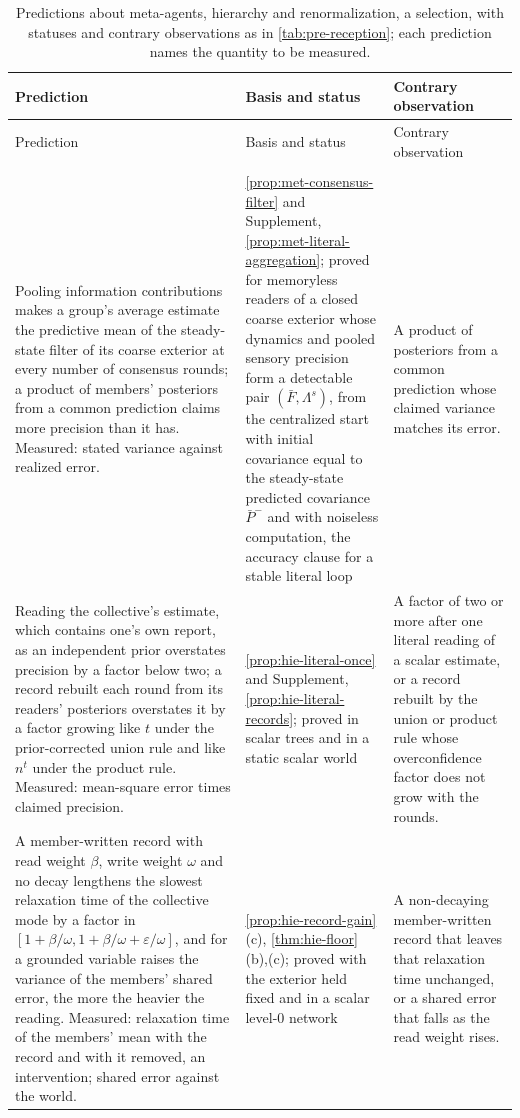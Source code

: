 \begingroup
\footnotesize
\setlength{\tabcolsep}{4pt}
\begin{longtable}{@{}>{\raggedright\arraybackslash}p{6.5cm}>{\raggedright\arraybackslash}p{3.9cm}>{\raggedright\arraybackslash}p{5.1cm}@{}}
\caption{Predictions about meta-agents, hierarchy and renormalization, a selection, with statuses and contrary observations as in \cref{tab:pre-reception}; each prediction names the quantity to be measured.}\label{tab:pre-meta}\\
\toprule
Prediction & Basis and status & Contrary observation\\
\midrule
\endfirsthead
\toprule
Prediction & Basis and status & Contrary observation\\
\midrule
\endhead
\bottomrule
\endfoot
\multicolumn{3}{@{}l}{\textit{Meta-agents and hierarchy, \cref{hyp:int-h5}(a),(b)}}\\
Pooling information contributions makes a group's average estimate the predictive mean of the steady-state filter of its coarse exterior at every number of consensus rounds; a product of members' posteriors from a common prediction claims more precision than it has. Measured: stated variance against realized error. & \cref{prop:met-consensus-filter} and Supplement, \cref{prop:met-literal-aggregation}; proved for memoryless readers of a closed coarse exterior whose dynamics and pooled sensory precision form a detectable pair $(\bar F,\Lambda^s)$, from the centralized start with initial covariance equal to the steady-state predicted covariance $\bar P^-$ and with noiseless computation, the accuracy clause for a stable literal loop & A product of posteriors from a common prediction whose claimed variance matches its error.\\
\addlinespace
Reading the collective's estimate, which contains one's own report, as an independent prior overstates precision by a factor below two; a record rebuilt each round from its readers' posteriors overstates it by a factor growing like $t$ under the prior-corrected union rule and like $n^t$ under the product rule. Measured: mean-square error times claimed precision. & \cref{prop:hie-literal-once} and Supplement, \cref{prop:hie-literal-records}; proved in scalar trees and in a static scalar world & A factor of two or more after one literal reading of a scalar estimate, or a record rebuilt by the union or product rule whose overconfidence factor does not grow with the rounds.\\
\addlinespace
A member-written record with read weight $\beta$, write weight $\omega$ and no decay lengthens the slowest relaxation time of the collective mode by a factor in $[1+\beta/\omega,1+\beta/\omega+\varepsilon/\omega]$, and for a grounded variable raises the variance of the members' shared error, the more the heavier the reading. Measured: relaxation time of the members' mean with the record and with it removed, an intervention; shared error against the world. & \cref{prop:hie-record-gain}(c), \cref{thm:hie-floor}(b),(c); proved with the exterior held fixed and in a scalar level-0 network & A non-decaying member-written record that leaves that relaxation time unchanged, or a shared error that falls as the read weight rises.\\

\end{longtable}
